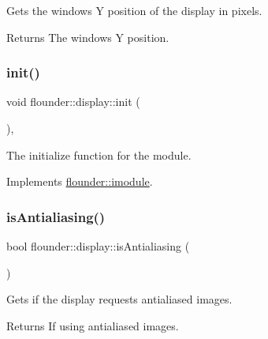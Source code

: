 Gets the windows Y position of the display in pixels. 

\begin{DoxyReturn}{Returns}
The windows Y position. 
\end{DoxyReturn}
\mbox{\label{classflounder_1_1display_aa28a814bc8ba635c99aa4b707bac3259}} 
\subsubsection{\texorpdfstring{init()}{init()}}
{\footnotesize\ttfamily void flounder\+::display\+::init (\begin{DoxyParamCaption}{ }\end{DoxyParamCaption})\hspace{0.3cm}{\ttfamily [override]}, {\ttfamily [virtual]}}



The initialize function for the module. 



Implements \hyperlink{classflounder_1_1imodule_a1725ef346952884d0741de61aba1e0c7}{flounder\+::imodule}.

\mbox{\label{classflounder_1_1display_ab36d40e6a3be5272853e13e45da750b8}} 
\subsubsection{\texorpdfstring{is\+Antialiasing()}{isAntialiasing()}}
{\footnotesize\ttfamily bool flounder\+::display\+::is\+Antialiasing (\begin{DoxyParamCaption}{ }\end{DoxyParamCaption})}



Gets if the display requests antialiased images. 

\begin{DoxyReturn}{Returns}
If using antialiased images. 
\end{DoxyReturn}
\mbox{\label{classflounder_1_1display_af187a33ad8b4e112a638adfdd3062fb3}} 
